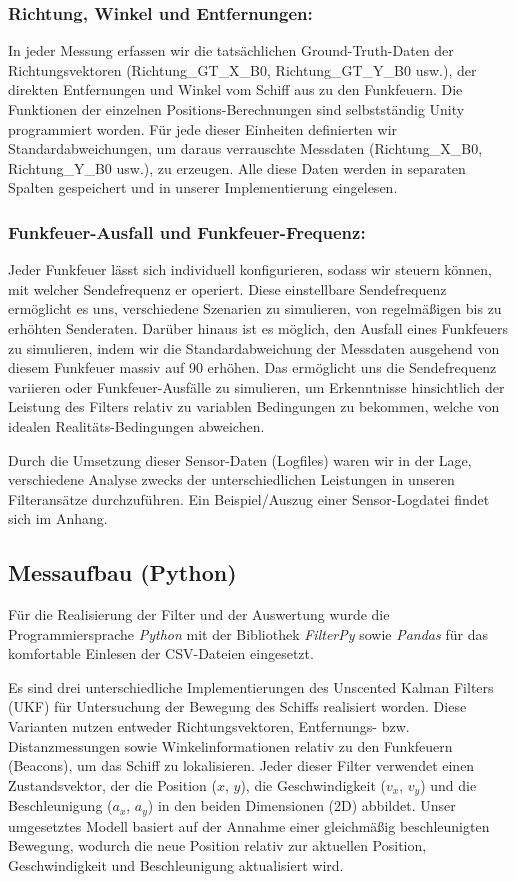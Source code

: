 \documentclass[conference]{IEEEtran}[10pt]
\begin{document}
\subsubsection{Richtung, Winkel und Entfernungen:} In jeder Messung erfassen wir die tatsächlichen Ground-Truth-Daten der Richtungsvektoren (Richtung\_GT\_X\_B0, Richtung\_GT\_Y\_B0 usw.), der direkten Entfernungen und Winkel vom Schiff aus zu den Funkfeuern. Die Funktionen der einzelnen Positions-Berechnungen sind selbstständig Unity programmiert worden. Für jede dieser Einheiten definierten wir Standardabweichungen, um daraus  verrauschte Messdaten (Richtung\_X\_B0, Richtung\_Y\_B0 usw.), zu erzeugen.  Alle diese Daten werden in separaten Spalten gespeichert und in unserer Implementierung eingelesen.

\subsubsection{Funkfeuer-Ausfall und Funkfeuer-Frequenz:}  Jeder Funkfeuer lässt sich individuell konfigurieren, sodass wir steuern können, mit welcher Sendefrequenz er operiert. Diese einstellbare Sendefrequenz ermöglicht es uns, verschiedene Szenarien zu simulieren, von regelmäßigen bis zu erhöhten Senderaten. Darüber hinaus ist es möglich, den Ausfall eines Funkfeuers zu simulieren, indem wir die Standardabweichung der Messdaten ausgehend von diesem Funkfeuer massiv auf 90 erhöhen. Das ermöglicht uns die Sendefrequenz variieren oder Funkfeuer-Ausfälle zu simulieren, um Erkenntnisse hinsichtlich der Leistung des Filters relativ zu variablen Bedingungen zu bekommen, welche von idealen Realitäts-Bedingungen abweichen.

Durch die Umsetzung dieser Sensor-Daten (Logfiles) waren wir in der Lage, verschiedene Analyse zwecks der unterschiedlichen Leistungen in unseren Filteransätze durchzuführen. Ein Beispiel/Auszug einer Sensor-Logdatei findet sich im Anhang.

\subsection{Messaufbau (Python)}

Für die Realisierung der Filter und der Auswertung wurde die Programmiersprache \textit{Python} mit der Bibliothek \textit{FilterPy} sowie \textit{Pandas} für das komfortable Einlesen der CSV-Dateien eingesetzt.

Es sind drei unterschiedliche Implementierungen des Unscented Kalman Filters (UKF)  für Untersuchung der Bewegung des Schiffs realisiert worden. 
Diese Varianten nutzen entweder Richtungsvektoren, Entfernungs- bzw. Distanzmessungen sowie Winkelinformationen relativ zu den Funkfeuern (Beacons), um das Schiff zu lokalisieren. Jeder dieser Filter verwendet einen Zustandsvektor, der die Position (\(x\), \(y\)), die Geschwindigkeit (\(v_x\), \(v_y\)) und die Beschleunigung (\(a_x\), \(a_y\)) in den beiden Dimensionen (2D) abbildet. Unser umgesetztes Modell basiert auf der Annahme einer gleichmäßig beschleunigten Bewegung, wodurch die neue Position relativ zur aktuellen Position, Geschwindigkeit und Beschleunigung aktualisiert wird.
\end{document}
